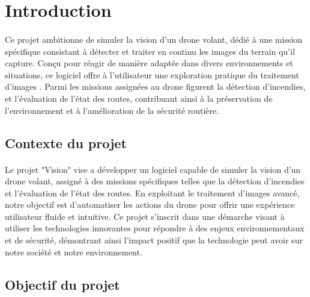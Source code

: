 \newpage
\section{Introduction}
\label{sec:introduction}

\paragraph{}Ce projet ambitionne de simuler la vision d'un drone volant, dédié à une mission spécifique consistant à détecter et traiter en continu les images du terrain qu'il capture. Conçu pour réagir de manière adaptée dans divers environnements et situations, ce logiciel offre à l'utilisateur une exploration pratique du traitement d'images . Parmi les missions assignées au drone figurent la détection d'incendies, et l'évaluation de l'état des routes, contribuant ainsi à la préservation de l'environnement et à l'amélioration de la sécurité routière.


\subsection{Contexte du projet}
\paragraph{}Le projet "Vision" vise a développer un logiciel capable de simuler la vision d'un drone volant, assigné à des missions spécifiques telles que la détection d'incendies et l'évaluation de l'état des routes. En exploitant le traitement d'images avancé, notre objectif est d'automatiser les actions du drone pour offrir une expérience utilisateur fluide et intuitive. Ce projet s'inscrit dans une démarche visant à utiliser les technologies innovantes pour répondre à des enjeux environnementaux et de sécurité, démontrant ainsi l'impact positif que la technologie peut avoir sur notre société et notre environnement. 

\subsection{Objectif du projet}
